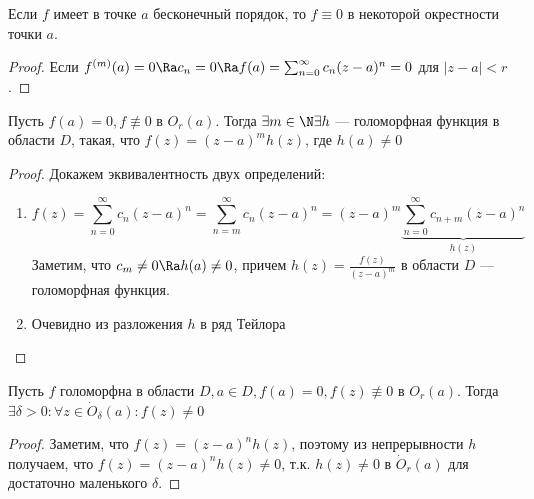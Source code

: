 \begin{note}
    Если \(f\) имеет в точке \(a\) бесконечный порядок, то \(f \equiv 0\) в некоторой окрестности точки \(a\).
\end{note}
\begin{proof}
    Если \(f^{(m)}(a) = 0 \Ra c_n = 0 \Ra f(a) = \sum_{n = 0}^\infty c_n(z - a)^n = 0\) для \(|z - a| < r\).
\end{proof}

\begin{proposition}
    Пусть \(f(a) = 0, f \not\equiv 0\) в \(O_r(a)\). Тогда \(\exists m \in \N \exists h\) --- голоморфная функция в области \(D\), такая, что \(f(z) = (z - a)^mh(z)\), где \(h(a) \ne 0\)
\end{proposition}
\begin{proof}
    Докажем эквивалентность двух определений:
    \begin{enumerate}
        \item[\(\Downarrow\)]
        \[f(z) = \sum_{n = 0}^\infty c_n(z - a)^n = \sum_{n = m}^\infty c_n(z - a)^n = (z - a)^m\underbrace{\sum_{n = 0}^\infty c_{n + m}(z - a)^n}_{h(z)}\]
        Заметим, что \(c_m \ne 0 \Ra h(a) \ne 0\), причем \(h(z) = \frac{f(z)}{(z - a)^m}\) в области \(D\) --- голоморфная функция.
        \item[\(\Uparrow\)] Очевидно из разложения \(h\) в ряд Тейлора
    \end{enumerate}
\end{proof}

\begin{corollary}
    Пусть \(f\) голоморфна в области \(D, a \in D, f(a) = 0, f(z) \not\equiv 0\) в \(O_r(a)\). Тогда \(\exists \delta > 0: \forall z \in \dot O_\delta(a): f(z) \ne 0\)
\end{corollary}
\begin{proof}
    Заметим, что \(f(z) = (z - a)^nh(z)\), поэтому из непрерывности \(h\) получаем, что \(f(z) = (z - a)^nh(z) \ne 0\), т.к. \(h(z) \ne 0\) в \(\dot O_r(a)\) для достаточно маленького \(\delta\).
\end{proof}


